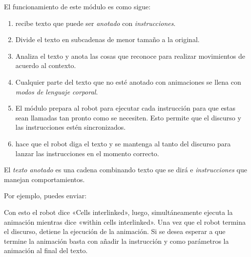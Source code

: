 El funcionamiento de este módulo es como sigue:
\begin{enumerate}
\item {} 
 recibe texto que puede ser \textit{anotado} con \textit{instrucciones}.

\item {} 
Divide el texto en subcadenas de menor tamaño a la original.

\item {} 
Analiza el texto y anota las cosas que reconoce para realizar movimientos de acuerdo al contexto.

\item {} 
Cualquier parte del texto que no esté anotado con animaciones se llena con \textit{modos de lenguaje corporal}.

\item {} 
El módulo prepara al robot para ejecutar cada instrucción para que estas sean llamadas tan pronto como se necesiten. Esto permite que el discurso y las instrucciones estén sincronizados.

\item {} 
 hace que el robot diga el texto y se mantenga al tanto del discurso para lanzar las instrucciones en el momento correcto.

\end{enumerate}

El \textit{texto anotado} es una cadena combinando texto que se dirá e \textit{instrucciones}
que manejan comportamientos.

Por ejemplo, puedes enviar:

\begin{sphinxVerbatim}[commandchars=\\\{\}]
\end{sphinxVerbatim}

Con esto el robot dice «Cells interlinked», luego, simultáneamente ejecuta la
animación  mientras dice «within cells interlinked».
Una vez que el robot termina el discurso, detiene la ejecución de la animación.
Si se desea esperar a que termine la animación basta con añadir la instrucción
 y como parámetros la animación al final del texto.

